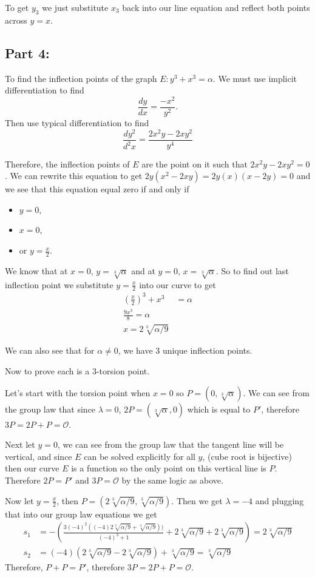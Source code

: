 \documentclass[12pt,letterpaper]{article}
\begin{document}
    To get $y_3$ we just substitute $x_3$ back into our line equation and reflect both points across $y=x$.
\subsection*{Part 4:}

    To find the inflection points of the graph $E : y^3+x^3=\alpha$. We must use implicit differentiation to find
    $$\frac{dy}{dx}=\frac{-x^2}{y^2}.$$
    Then use typical differentiation to find
    $$\frac{dy^2}{d^2x} = \frac{2x^2y-2xy^2}{y^4}$$
    
    Therefore, the inflection points of $E$ are the point on it such that $2x^2y-2xy^2=0$. We can rewrite this equation to get $2y(x^2-2xy)=2y(x)(x-2y)=0$ and we see that this equation equal zero if and only if
    \begin{itemize}
        \item $y=0$,
        \item $x=0$,
        \item or $y=\frac{x}{2}$.
    \end{itemize}
    
    We know that at $x=0$, $y=\sqrt[3]{\alpha}$ and at $y=0$, $x=\sqrt[3]{\alpha}$. So to find out last inflection point we substitute $y=\frac{x}{2}$ into our curve to get
    \begin{align*}
        \left(\frac{x}{2} \right)^3 + x^3 &= \alpha\\
        \frac{9x^3}{8} = \alpha\\
        x = 2\sqrt[3]{\alpha/9}
    \end{align*}
    
    We can also see that for $\alpha\not=0$, we have 3 unique inflection points.
    
    Now to prove each is a 3-torsion point.
    
    Let's start with the torsion point when $x=0$ so $P=(0,\sqrt[3]{\alpha}).$ We can see from the group law that since $\lambda = 0$, $2P = (\sqrt[3]{\alpha},0)$ which is equal to $P'$, therefore $3P = 2P + P = \mathcal{O}$.
    
    Next let $y=0$, we can see from the group law that the tangent line will be vertical, and since $E$ can be solved explicitly for all $y$, (cube root is bijective) then our curve $E$ is a function so the only point on this vertical line is $P$. Therefore $2P = P'$ and $3P =\mathcal{O}$ by the same logic as above.
    
    Now let $y=\frac{x}{2}$, then $P=(2\sqrt[3]{\alpha/9},\sqrt[3]{\alpha/9})$. Then we get $\lambda = -4$ and plugging that into our group law equations we get 
    \begin{align*}
        s_1 &= -\left( \frac{3(-4)^2((-4) 2\sqrt[3]{\alpha/9}+\sqrt[3]{\alpha/9}))}{(-4)^3 + 1} + 2\sqrt[3]{\alpha/9} + 2\sqrt[3]{\alpha/9}\right) = 2\sqrt[3]{\alpha/9}\\
        s_2 &= (-4)(2\sqrt[3]{\alpha/9}-2\sqrt[3]{\alpha/9}) + \sqrt[3]{\alpha/9} = \sqrt[3]{\alpha/9}
    \end{align*}
    Therefore, $P+P=P'$, therefore $3P = 2P + P = \mathcal{O}$.
    
\end{document}
